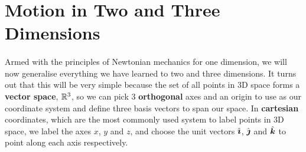 \documentclass[../newtonian_mechanics.tex]{subfiles}
\begin{document}
    \section{Motion in Two and Three Dimensions}
        \paragraph{}
        Armed with the principles of Newtonian mechanics for one dimension, we will now generalise everything we have learned to two and three dimensions. It turns out that this will be very simple because the set of all points in 3D space forms a \textbf{vector space}, $\mathbb{R}^3$, so we can pick 3 \textbf{orthogonal} axes and an origin to use as our coordinate system and define three basis vectors to span our space. In \textbf{cartesian} coordinates, which are the most commonly used system to label points in 3D space, we label the axes $x$, $y$ and $z$, and choose the unit vectors $\hat{\boldsymbol{\imath}}$, $\hat{\boldsymbol{\jmath}}$ and $\hat{\boldsymbol{k}}$ to point along each axis respectively.
\end{document}
